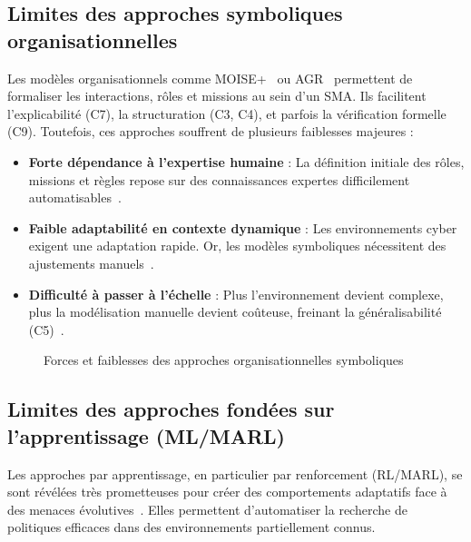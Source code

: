 \documentclass[ twoside,openright,titlepage,numbers=noenddot,headinclude,%
                footinclude=true,cleardoublepage=empty,abstractoff, %
                BCOR=5mm,paper=a4,fontsize=11pt,%
                french,american,%
                ]{scrreprt}
\begin{document}
\subsection{Limites des approches symboliques organisationnelles}

Les modèles organisationnels comme MOISE+~\cite{Hübner2002} ou AGR~\cite{Ferber2003} permettent de formaliser les interactions, rôles et missions au sein d'un SMA. Ils facilitent l'explicabilité (C7), la structuration (C3, C4), et parfois la vérification formelle (C9). Toutefois, ces approches souffrent de plusieurs faiblesses majeures :

\begin{itemize}
    \item \textbf{Forte dépendance à l'expertise humaine} : La définition initiale des rôles, missions et règles repose sur des connaissances expertes difficilement automatisables~\cite{Boella2008}.
    \item \textbf{Faible adaptabilité en contexte dynamique} : Les environnements cyber exigent une adaptation rapide. Or, les modèles symboliques nécessitent des ajustements manuels~\cite{Chehbi2020}.
    \item \textbf{Difficulté à passer à l'échelle} : Plus l'environnement devient complexe, plus la modélisation manuelle devient coûteuse, freinant la généralisabilité (C5)~\cite{Picard2003}.
\end{itemize}

\begin{figure}[H]
    \centering
    \caption{Forces et faiblesses des approches organisationnelles symboliques}
    \label{fig:limits_symbolic}
\end{figure}

\subsection{Limites des approches fondées sur l'apprentissage (ML/MARL)}

Les approches par apprentissage, en particulier par renforcement (RL/MARL), se sont révélées très prometteuses pour créer des comportements adaptatifs face à des menaces évolutives~\cite{Zhang2021survey, Kim2020rlcyberdefense}. Elles permettent d'automatiser la recherche de politiques efficaces dans des environnements partiellement connus.
\end{document}
